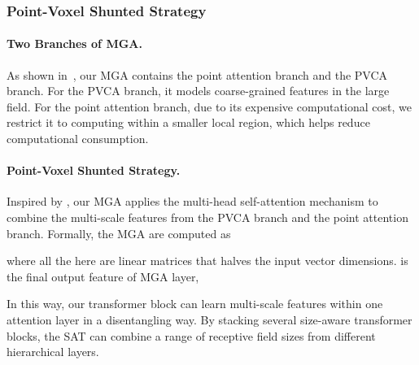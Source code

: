 \documentclass[10pt,twocolumn,letterpaper]{article}
\begin{document}









\subsubsection{Point-Voxel Shunted Strategy} \label{sec-pvshunt}
\paragraph{Two Branches of MGA.}As shown in~, our MGA contains the point attention branch and the PVCA branch. For the PVCA branch, it models coarse-grained features in the large field. For the point attention branch, due to its expensive computational cost, we restrict it to computing within a smaller local region, which helps reduce computational consumption.

\paragraph{Point-Voxel Shunted Strategy.}Inspired by \cite{shunted2d2022}, our MGA applies the multi-head self-attention mechanism to combine the multi-scale features from the PVCA branch and the point attention branch. Formally, the MGA are computed as

where all the  here are linear matrices that halves the input vector dimensions.  is the final output feature of MGA layer,  


In this way, our transformer block can learn multi-scale features within one attention layer in a disentangling way. By stacking several size-aware transformer blocks, the SAT can combine a range of receptive field sizes from different hierarchical layers. 
\end{document}
